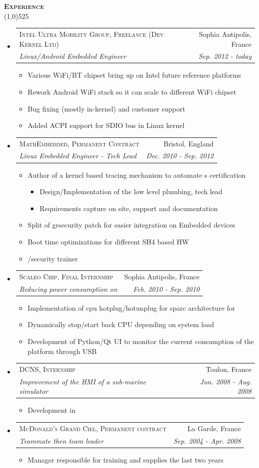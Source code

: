 \documentclass[letterpaper,11pt]{article}
\makeatletter
\newcommand{\resitem}[1]{\item #1}
\newcommand{\titlecolor}[0]{RoyalBlue4}
\newcommand{\bulletcolor}[0]{darkgray}
\newcommand{\resheading}[1]{
  \vspace{10pt}
  {\Large
        \textsc{\textcolor{\titlecolor}{\textbf{#1}}}
  } \\
  \vspace{-10.5pt}
  \hspace{-1pt}\textcolor{\titlecolor}{\line(1,0){525}}
}
\newcommand{\ressubheading}[4]{
  \vspace{12pt}
  \begin{tabular*}{7.0in}{l@{\extracolsep{\fill}}r}
    \textsc{#1} & #2 \\
    \textsl{#3} & \textit{#4} \\
  \end{tabular*}
  \vspace{4pt}
}
\newcommand{\prettylist}[0]{
  \begin{itemize}
    \renewcommand{\labelitemi}{{\tiny \textcolor{\bulletcolor}{$\bullet$}}}
    \renewcommand{\labelitemiii}{$\cdot$}
}
\newcommand{\acro}[1]{
  \hspace{-1pt}{\small\textsc{#1}}\hspace{-3pt}
}
\makeatother
\begin{document}
\vspace{5pt}
\resheading{Experience}
\vspace{3pt}
\prettylist
\item
  \ressubheading{Intel Ultra Mobility Group, Freelance (Dev Kernel Ltd)}{Sophia
    Antipolis, France}{Linux/Android Embedded Engineer}{Sep. 2012 - today}
  \begin{itemize}
    \resitem{Various WiFi/BT chipset bring up on Intel future reference platforms}
    \resitem{Rework Android WiFi stack so it can scale to different WiFi chipset}
    \resitem{Bug fixing (mostly in-kernel) and customer support}
    \resitem{Added ACPI support for SDIO bus in Linux kernel}
  \end{itemize}
\item
  \ressubheading{MathEmbedded, Permanent Contract}{Bristol, England}{Linux
    Embedded Engineer - Tech Lead}{Dec. 2010 - Sep. 2012}
  \begin{itemize}
    \resitem{Author of a kernel based tracing mechanism to automate \acro{STB}s certification}
    \begin{itemize}
      \resitem{Design/Implementation of the low level plumbing, tech lead}
      \resitem{Requirements capture on site, support and documentation}
    \end{itemize}
    \resitem{Split of grsecurity patch for easier integration on Embedded devices}
    \resitem{Boot time optimizations for different SH4 based HW}
    \resitem{\acro{Linux}/security trainer}
  \end{itemize}
\vspace{1.1pt}\item
  \ressubheading{Scaleo Chip, Final Internship}{Sophia Antipolis,
    France}{Reducing power consumption on \acro{Linux-SMP SoC}}{Feb. 2010 -
    Sep. 2010}
  \begin{itemize}
    \resitem{Implementation of cpu hotplug/hotunplug for sparc architecture for \acro{Linux}} 
    \resitem{Dynamically stop/start back CPU depending on system load}
    \resitem{Development of Python/Qt UI to monitor the current consumption of the platform through USB}
  \end{itemize}
\vspace{1.1pt}\item
  \ressubheading{DCNS, Internship}{Toulon, France}{Improvement of the HMI of a sub-marine simulator}{Jun. 2008 - Aug. 2008}
  \begin{itemize}
    \resitem Development in\acro{OpenMotif/C}
  \end{itemize}
\item
  \ressubheading{McDonald's Grand Ciel, Permanent contract}{La Garde,
    France}{Teammate then team leader}{Sep. 2004 - Apr. 2008}
  \begin{itemize}
    \resitem Manager responsible for training and supplies the last two years
  \end{itemize}
\end{itemize}
\end{document}
